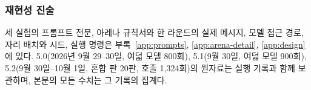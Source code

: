 






\subsubsection*{재현성 진술}
세 실험의 프롬프트 전문, 아레나 규칙서와 한 라운드의 실제 메시지, 모델 접근 경로, 자리 배치와 시드, 실행 명령은 부록~\ref{app:prompts}, \ref{app:arena-detail}, \ref{app:design}에 있다. 5.0(2026년 9월 29--30일, 여덟 모델 800회), 5.1(9월 30일, 여덟 모델 900회), 5.2(9월 30일--10월 1일, 혼합 판 20판, 호출 1,324회)의 원자료는 실행 기록과 함께 보관하며, 본문의 모든 수치는 그 기록의 집계다.

\clearpage



\clearpage
\appendix

